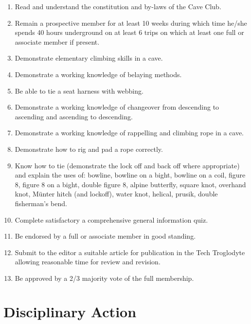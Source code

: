 \documentclass[
]{article}
\providecommand{\tightlist}{%
  \setlength{\itemsep}{0pt}\setlength{\parskip}{0pt}}
\begin{document}
\begin{enumerate}
  \begin{enumerate}
  \def\labelenumii{\Alph{enumii}.}
  \tightlist
  \item
    Read and understand the constitution and by-laws of the Cave Club.
  \item
    Remain a prospective member for at least 10 weeks during which time
    he/she spends 40 hours underground on at least 6 trips on which at
    least one full or associate member if present.
  \item
    Demonstrate elementary climbing skills in a cave.
  \item
    Demonstrate a working knowledge of belaying methods.
  \item
    Be able to tie a seat harness with webbing.
  \item
    Demonstrate a working knowledge of changeover from descending to
    ascending and ascending to descending.
  \item
    Demonstrate a working knowledge of rappelling and climbing rope in a
    cave.
  \item
    Demonstrate how to rig and pad a rope correctly.
  \item
    Know how to tie (demonstrate the lock off and back off where
    appropriate) and explain the uses of: bowline, bowline on a bight,
    bowline on a coil, figure 8, figure 8 on a bight, double figure 8,
    alpine butterfly, square knot, overhand knot, Münter hitch (and
    lockoff), water knot, helical, prusik, double fisherman's bend.
  \item
    Complete satisfactory a comprehensive general information quiz.
  \item
    Be endorsed by a full or associate member in good standing.
  \item
    Submit to the editor a suitable article for publication in the Tech
    Troglodyte allowing reasonable time for review and revision.
  \item
    Be approved by a 2/3 majority vote of the full membership.
  \end{enumerate}
\end{enumerate}

\hypertarget{disciplinary-action}{%
\section{Disciplinary Action}\label{disciplinary-action}}
\end{document}
